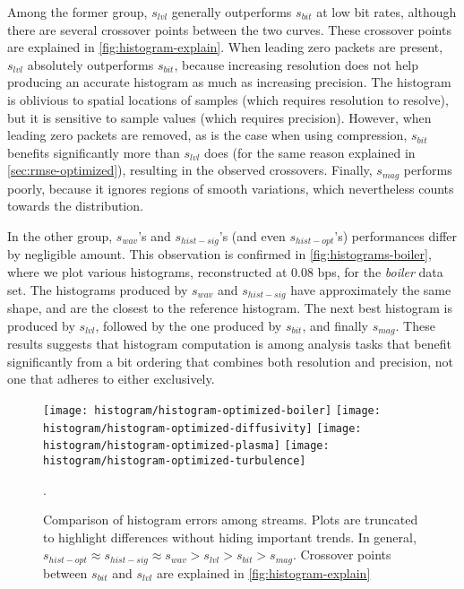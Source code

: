 Among the former group, $s_{lvl}$ generally outperforms $s_{bit}$ at low bit rates, although there
are several crossover points between the two curves. These crossover points are explained in
\autoref{fig:histogram-explain}. When leading zero packets are present, $s_{lvl}$ absolutely
outperforms $s_{bit}$, because increasing resolution does not help producing an accurate histogram
as much as increasing precision. The histogram is oblivious to spatial locations of samples (which
requires resolution to resolve), but it is sensitive to sample values (which requires precision).
However, when leading zero packets are removed, as is the case when using compression, $s_{bit}$
benefits significantly more than $s_{lvl}$ does (for the same reason explained in
\autoref{sec:rmse-optimized}), resulting in the observed crossovers. Finally, $s_{mag}$ performs
poorly, because it ignores regions of smooth variations, which nevertheless counts towards the
distribution.

In the other group, $s_{wav}$'s and $s_{hist-sig}$'s (and even $s_{hist-opt}$'s) performances
differ by negligible amount. This observation is confirmed in \autoref{fig:histograms-boiler}, where
we plot various histograms, reconstructed at 0.08 bps, for the \emph{boiler} data set. The histograms
produced by $s_{wav}$ and $s_{hist-sig}$ have approximately the same shape, and are the closest to
the reference histogram. The next best histogram is produced by $s_{lvl}$, followed by the one
produced by $s_{bit}$, and finally $s_{mag}$. These results suggests that histogram computation is
among analysis tasks that benefit significantly from a bit ordering that combines both resolution
and precision, not one that adheres to either exclusively.

\begin{figure}[t]
	\centering
	{\texttt{[image: histogram/histogram-optimized-boiler]}}
	{\texttt{[image: histogram/histogram-optimized-diffusivity]}}
	{\texttt{[image: histogram/histogram-optimized-plasma]}}
	{\texttt{[image: histogram/histogram-optimized-turbulence]}}
	\caption{Comparison of histogram errors among streams. Plots are truncated to highlight
	differences without hiding important trends. In general, $s_{hist-opt}\approx s_{hist-sig}\approx
	s_{wav} > s_{lvl} > s_{bit} > s_{mag}$. Crossover points between $s_{bit}$ and $s_{lvl}$ are
	explained in \autoref{fig:histogram-explain}}.
	\label{fig:histogram-stream-comparison}
\end{figure}

